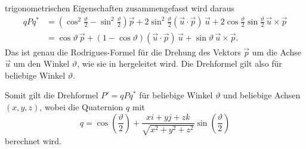 trigonometrischen Eigenschaften zusammengefasst wird daraus
\begin{align*}
    qPq^{*}
    &= \left(\cos^2\frac{\vartheta}{2} - \sin^2\frac{\vartheta}{2}\right)\vec{p}
    + 2\sin^2\frac{\vartheta}{2}(\vec{u}\cdot\vec{p})\,\vec{u}
    + 2\cos\frac{\vartheta}{2}\sin\frac{\vartheta}{2}\,\vec{u}\times\vec{p} \\
    &= \cos\vartheta\,\vec{p}
    + (1 - \cos\vartheta)(\vec{u}\cdot\vec{p})\,\vec{u}
    + \sin\vartheta\,\vec{u}\times\vec{p}.
\end{align*}
Das ist genau die Rodrigues-Formel für die Drehung des Vektors $\vec{p}$ um
die Achse $\vec{u}$ um den Winkel $\vartheta$, wie sie in
\cite{qa:linalg-qa} hergeleitet wird. Die Drehformel gilt also für beliebige
Winkel $\vartheta$.

Somit gilt die Drehformel $P' = qPq^{*}$ für beliebige Winkel $\vartheta$ und beliebige Achsen $(x,y,z)$,
wobei die Quaternion $q$ mit
\begin{equation*}
    q = \cos\left(\frac{\vartheta}{2}\right) 
    + \frac{xi + yj + zk}{\sqrt{x^2 + y^2 + z^2}}
    \sin\left(\frac{\vartheta}{2}\right)
\end{equation*}
berechnet wird.
